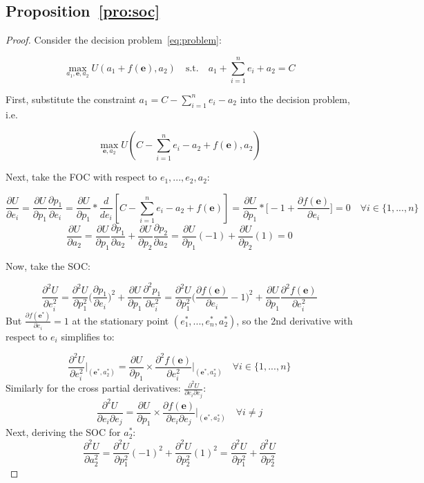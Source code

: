\documentclass[11pt]{article}
\theoremstyle{definition}
\theoremstyle{remark}
\begin{document}
\subsection{Proposition~\ref{pro:soc}}
\label{app:soc}
\begin{proof}
Consider the decision problem~\ref{eq:problem}:

$$\max_{a_1,\mathbf{e},a_2} U(a_1+f(\mathbf{e}),a_2) 
\quad \text{s.t.} \quad a_1 + \sum_{i=1}^n e_i + a_2 = C$$

First, substitute the constraint $a_1=C-\sum_{i=1}^n e_i-a_2$ into the decision problem, i.e.

$$\max_{\mathbf{e},a_2} U(C-\sum_{i=1}^n e_i-a_2+f(\mathbf{e}),a_2)$$

Next, take the FOC with respect to $e_1,...,e_2,a_2$:

$$\frac{\partial U}{\partial e_i}=\frac{\partial U}{\partial p_1}\frac{\partial p_1}{\partial e_i}=\frac{\partial U}{\partial p_1}*\frac{d}{de_i}[C-\sum_{i=1}^n e_i-a_2+f(\mathbf{e})]=\frac{\partial U}{\partial p_1}*\bigg[-1+\frac{\partial f(\mathbf{e})}{\partial e_i}\bigg]=0\quad\forall i\in\{1,...,n\}$$
$$\frac{\partial U}{\partial a_2}=\frac{\partial U}{\partial p_1}\frac{\partial p_1}{\partial a_2}+\frac{\partial U}{\partial p_2}\frac{\partial p_2}{\partial a_2}=\frac{\partial U}{\partial p_1}(-1)+\frac{\partial U}{\partial p_2}(1)=0$$

Now, take the SOC:

$$\frac{\partial^2 U}{\partial e_i^2}=\frac{\partial^2 U}{\partial p_1^2}\bigg(\frac{\partial p_1}{\partial e_i}\bigg)^2+\frac{\partial U}{\partial p_1}\frac{\partial^2 p_1}{\partial e_i^2}=\frac{\partial^2 U}{\partial p_1^2}\bigg(\frac{\partial f(\mathbf{e})}{\partial e_i}-1\bigg)^2+\frac{\partial U}{\partial p_1}\frac{\partial^2 f(\mathbf{e})}{\partial e_i^2}$$
But $\frac{\partial f(\mathbf{e^*})}{\partial e_i}=1$ at the stationary point $(e_1^*,...,e^*_n,a_2^*)$, so the 2nd derivative with respect to $e_i$ simplifies to:

$$\frac{\partial^2 U}{\partial e_i^2}\bigg|_{(\mathbf{e}^*,a^*_2)}=\frac{\partial U}{\partial p_1}\times\frac{\partial^2 f(\mathbf{e})}{\partial e_i^2}\bigg|_{(\mathbf{e}^*,a^*_2)}\quad\forall i\in\{1,...,n\}$$
Similarly for the cross partial derivatives: $\frac{\partial^2 U}{\partial e_i\partial e_j}$:
$$\frac{\partial^2 U}{\partial e_i\partial e_j}=\frac{\partial U}{\partial p_1}\times\frac{\partial f(\mathbf{e})}{\partial e_i\partial e_j}\bigg|_{(\mathbf{e}^*,a^*_2)}\quad\forall i\neq j$$
Next, deriving the SOC for $a^*_2$:
$$\frac{\partial^2 U}{\partial a_2^2}=\frac{\partial^2 U}{\partial p_1^2}(-1)^2+\frac{\partial^2 U}{\partial p_2^2}(1)^2=\frac{\partial^2 U}{\partial p_1^2}+\frac{\partial^2 U}{\partial p_2^2}$$


\end{proof}
\end{document}
